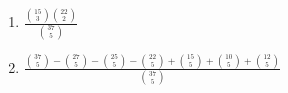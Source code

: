 \begin{enumerate}[label=(\alph*)]
\item $\frac{\binom{15}{3}\binom{22}{2}}{\binom{37}{5}}$

\item $\frac{\binom{37}{5} - \binom{27}{5} - \binom{25}{5} - 
\binom{22}{5} + \binom{15}{5} + \binom{10}{5} + \binom{12}{5}}{\binom{37}{5}}$
\end{enumerate}
